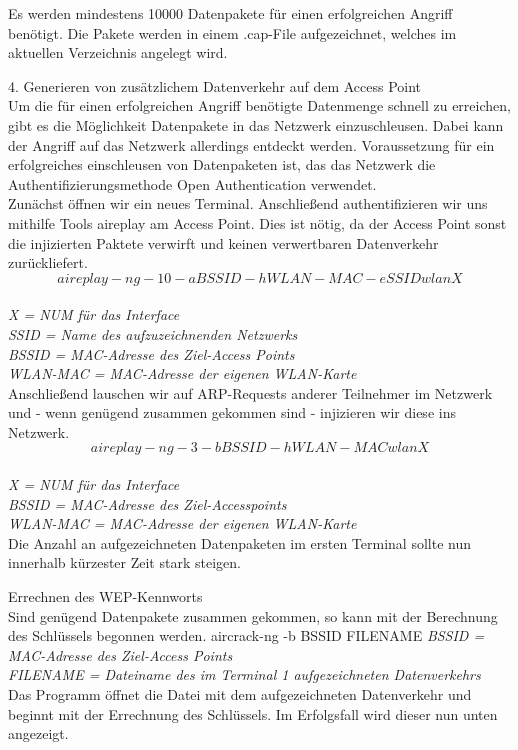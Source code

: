 Es werden mindestens 10000 Datenpakete für einen erfolgreichen Angriff benötigt. Die Pakete werden in einem .cap-File aufgezeichnet, welches im aktuellen Verzeichnis angelegt wird.

{\Large 4. Generieren von zusätzlichem Datenverkehr auf dem Access Point}\\
Um die für einen erfolgreichen Angriff benötigte Datenmenge schnell zu erreichen, gibt es die Möglichkeit Datenpakete in das Netzwerk einzuschleusen. Dabei kann der Angriff auf das Netzwerk allerdings entdeckt werden.
Voraussetzung für ein erfolgreiches einschleusen von Datenpaketen ist, das das Netzwerk die Authentifizierungsmethode Open Authentication verwendet. 
\\
Zunächst öffnen wir ein neues Terminal. Anschließend authentifizieren wir uns mithilfe Tools aireplay am Access Point. Dies ist nötig, da der Access Point sonst die injizierten Paktete verwirft und keinen verwertbaren Datenverkehr zurückliefert. 
$$aireplay-ng -1 0 -a BSSID -h WLAN-MAC -e SSID wlanX $$\\

\textit{X = NUM für das Interface}\\
\textit{SSID = Name des aufzuzeichnenden Netzwerks}\\
\textit{BSSID = MAC-Adresse des Ziel-Access Points}\\
\textit{WLAN-MAC = MAC-Adresse der eigenen WLAN-Karte}\\

Anschließend lauschen wir auf ARP-Requests anderer Teilnehmer im Netzwerk und - wenn genügend zusammen gekommen sind - injizieren wir diese ins Netzwerk.
$$aireplay-ng -3 -b BSSID -h WLAN-MAC wlanX$$\\
\textit{X = NUM für das Interface}\\
\textit{BSSID = MAC-Adresse des Ziel-Accesspoints}\\
\textit{WLAN-MAC = MAC-Adresse der eigenen WLAN-Karte}\\

Die Anzahl an aufgezeichneten Datenpaketen im ersten Terminal sollte nun innerhalb kürzester Zeit stark steigen.

{\Large Errechnen des WEP-Kennworts}\\
Sind genügend Datenpakete zusammen gekommen, so kann mit der Berechnung des Schlüssels begonnen werden.
aircrack-ng -b BSSID FILENAME
\textit{BSSID = MAC-Adresse des Ziel-Access Points}\\
\textit{FILENAME = Dateiname des im Terminal 1 aufgezeichneten Datenverkehrs}\\
Das Programm öffnet die Datei mit dem aufgezeichneten Datenverkehr und beginnt mit der Errechnung des Schlüssels. Im Erfolgsfall wird dieser nun unten angezeigt.

